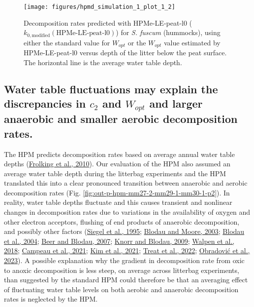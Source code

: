 \documentclass[
  12pt,
]{article}
\begin{document}
\begin{figure}[H]

{\centering \texttt{[image: figures/hpmd\_simulation\_1\_plot\_1\_2]} 

}

\caption{Decomposition rates predicted with HPMe-LE-peat-l0 (\(k_{0,\text{modified}}(\text{HPMe-LE-peat-l0})\)) for \emph{S. fuscum} (hummocks), using either the standard value for \(W_{opt}\) or the \(W_{opt}\) value estimated by HPMe-LE-peat-l0 versus depth of the litter below the peat surface. The horizontal line is the average water table depth.}\label{fig:out-sdm-parameters-standard-vs-estimated-p2}
\end{figure}

\hypertarget{out-discussion-4}{%
\subsection{\texorpdfstring{Water table fluctuations may explain the discrepancies in \(c_2\) and \(W_{opt}\) and larger anaerobic and smaller aerobic decomposition rates.}{Water table fluctuations may explain the discrepancies in c\_2 and W\_\{opt\} and larger anaerobic and smaller aerobic decomposition rates.}}\label{out-discussion-4}}

The HPM predicts decomposition rates based on average annual water table depths (\protect\hyperlink{ref-Frolking.2010}{Frolking et al., 2010}). Our evaluation of the HPM also assumed an average water table depth during the litterbag experiments and the HPM translated this into a clear pronounced transition between anaerobic and aerobic decomposition rates (Fig. \ref{fig:out-p-hpm-mm27-2-mm29-1-mm30-1-p2}). In reality, water table depths fluctuate and this causes transient and nonlinear changes in decomposition rates due to variations in the availability of oxygen and other electron acceptors, flushing of end products of anaerobic decomposition, and possibly other factors (\protect\hyperlink{ref-Siegel.1995}{Siegel et al., 1995}; \protect\hyperlink{ref-Blodau.2003}{Blodau and Moore, 2003}; \protect\hyperlink{ref-Blodau.2004}{Blodau et al., 2004}; \protect\hyperlink{ref-Beer.2007}{Beer and Blodau, 2007}; \protect\hyperlink{ref-Knorr.2009}{Knorr and Blodau, 2009}; \protect\hyperlink{ref-Walpen.2018}{Walpen et al., 2018}; \protect\hyperlink{ref-Campeau.2021}{Campeau et al., 2021}; \protect\hyperlink{ref-Kim.2021}{Kim et al., 2021}; \protect\hyperlink{ref-Treat.2022}{Treat et al., 2022}; \protect\hyperlink{ref-Obradovic.2023}{Obradović et al., 2023}). A possible explanation why the gradient in decomposition rate from oxic to anoxic decomposition is less steep, on average across litterbag experiments, than suggested by the standard HPM could therefore be that an averaging effect of fluctuating water table levels on both aerobic and anaerobic decomposition rates is neglected by the HPM.
\end{document}
